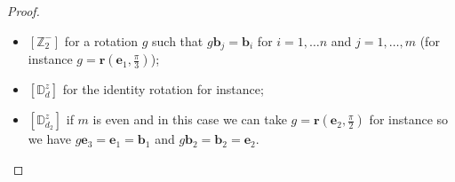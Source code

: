 \documentclass[11pt,a4paper]{amsart}
\theoremstyle{definition}
\newcommand{\ZZ}{\mathbb{Z}}                %
\newcommand{\DD}{\mathbb{D}}                %
\newcommand{\1}{\mathds{1}}		            %
\newcommand{\ee}{\pmb{e}}                   %
\newcommand{\vR}{\mathbf{r}}
\newcommand{\bb}{\mathbf{b}}
\newcommand{\set}[1]{\left\{#1\right\}}     %
\begin{document}
\begin{proof}
\begin{itemize}
	 	\item $[\ZZ_2^-]$ for a rotation $g$ such that $g\bb_j=\bb_i$ for $ i=1,\dotsc n$ and $j=1,\dotsc,m$ (for instance $g=\vR\left(\ee_1,\frac{\pi}{3}\right)$);
	 	\item $[\DD_d^z]$ for the identity rotation for instance;
	 	\item $[\DD_{d_2}^z]$ if $m$ is even and in this case we can take $g=\vR\left(\ee_2,\frac{\pi}{2}\right)$ for instance so we have $g\ee_3=\ee_1=\bb_1$ and $g\bb_2=\bb_2=\ee_2$.
	 \end{itemize}
\end{proof}
\end{document}
